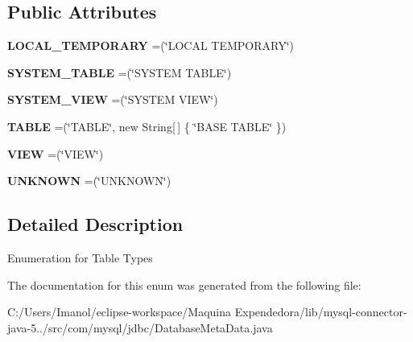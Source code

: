 \subsection*{Public Attributes}
\begin{DoxyCompactItemize}
\item 
\mbox{\label{enumcom_1_1mysql_1_1jdbc_1_1_database_meta_data_1_1_table_type_aa80e451349902ca038af0da5492bcf0a}} 
{\bfseries L\+O\+C\+A\+L\+\_\+\+T\+E\+M\+P\+O\+R\+A\+RY} =(\char`\"{}L\+O\+C\+AL T\+E\+M\+P\+O\+R\+A\+RY\char`\"{})
\item 
\mbox{\label{enumcom_1_1mysql_1_1jdbc_1_1_database_meta_data_1_1_table_type_a453ff0ac7520dd309cd0f0521bdba3ae}} 
{\bfseries S\+Y\+S\+T\+E\+M\+\_\+\+T\+A\+B\+LE} =(\char`\"{}S\+Y\+S\+T\+EM T\+A\+B\+LE\char`\"{})
\item 
\mbox{\label{enumcom_1_1mysql_1_1jdbc_1_1_database_meta_data_1_1_table_type_abade08fe2a456829a345d808e9463669}} 
{\bfseries S\+Y\+S\+T\+E\+M\+\_\+\+V\+I\+EW} =(\char`\"{}S\+Y\+S\+T\+EM V\+I\+EW\char`\"{})
\item 
\mbox{\label{enumcom_1_1mysql_1_1jdbc_1_1_database_meta_data_1_1_table_type_a6612e7591e27c0143fb0cbeaa15a85ba}} 
{\bfseries T\+A\+B\+LE} =(\char`\"{}T\+A\+B\+LE\char`\"{}, new String\mbox{[}$\,$\mbox{]} \{ \char`\"{}B\+A\+SE T\+A\+B\+LE\char`\"{} \})
\item 
\mbox{\label{enumcom_1_1mysql_1_1jdbc_1_1_database_meta_data_1_1_table_type_a683afe770937d585eef7fbd25e1617e2}} 
{\bfseries V\+I\+EW} =(\char`\"{}V\+I\+EW\char`\"{})
\item 
\mbox{\label{enumcom_1_1mysql_1_1jdbc_1_1_database_meta_data_1_1_table_type_a01a31399844f3519a0a06733391d519c}} 
{\bfseries U\+N\+K\+N\+O\+WN} =(\char`\"{}U\+N\+K\+N\+O\+WN\char`\"{})
\end{DoxyCompactItemize}


\subsection{Detailed Description}
Enumeration for Table Types 

The documentation for this enum was generated from the following file\+:\begin{DoxyCompactItemize}
\item 
C\+:/\+Users/\+Imanol/eclipse-\/workspace/\+Maquina Expendedora/lib/mysql-\/connector-\/java-\/5../src/com/mysql/jdbc/Database\+Meta\+Data.\+java\end{DoxyCompactItemize}
